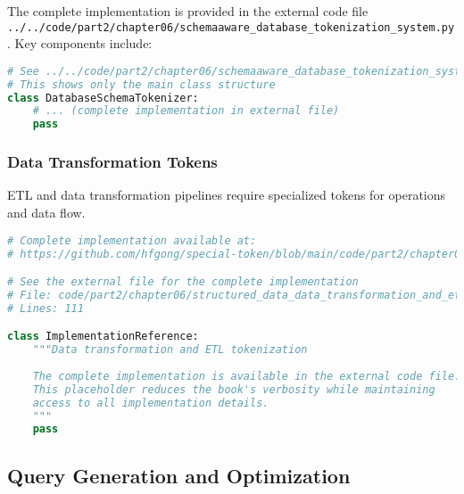 The complete implementation is provided in the external code file \texttt{../../code/part2/chapter06/schemaaware\_database\_tokenization\_system.py}. Key components include:

\begin{lstlisting}[language=Python, caption=Core structure (see external file for complete implementation)]
# See ../../code/part2/chapter06/schemaaware_database_tokenization_system.py for the complete implementation
# This shows only the main class structure
class DatabaseSchemaTokenizer:
    # ... (complete implementation in external file)
    pass
\end{lstlisting}
\subsubsection{Data Transformation Tokens}

ETL and data transformation pipelines require specialized tokens for operations and data flow.
\begin{comment}
Feedback: Explaining the "why" is important here as well. For example: "Data transformation pipelines involve a sequence of operations like 'JOIN', 'FILTER', 'GROUP_BY', and 'AGGREGATE'. By representing these operations as special tokens, the transformer can learn the common patterns and logic of data manipulation. This enables it to generate entire ETL scripts from a high-level description, treating the transformation process itself as a language to be generated."
\end{comment}

\begin{lstlisting}[language=Python, caption={Data transformation and ETL tokenization}]
# Complete implementation available at:
# https://github.com/hfgong/special-token/blob/main/code/part2/chapter06/structured_data_data_transformation_and_etl_to.py

# See the external file for the complete implementation
# File: code/part2/chapter06/structured_data_data_transformation_and_etl_to.py
# Lines: 111

class ImplementationReference:
    """Data transformation and ETL tokenization
    
    The complete implementation is available in the external code file.
    This placeholder reduces the book's verbosity while maintaining
    access to all implementation details.
    """
    pass
\end{lstlisting}

\subsection{Query Generation and Optimization}

